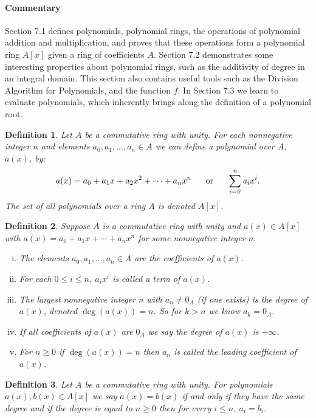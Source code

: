 \documentclass[letterpaper, 12pt]{article}
\newtheorem{defn}{Definition}
\begin{document}
			\paragraph{\color{blue}Commentary}
			\color{blue}
			Section 7.1 defines polynomials, polynomial rings, the operations of polynomial addition and multiplication, and proves that these operations form a polynomial ring $A[x]$ given a ring of coefficients $A$.
			Section 7.2 demonstrates some interesting properties about polynomial rings, such as the additivity of degree in an integral domain.
			This section also contains useful tools such as the Division Algorithm for Polynomials, and the function $\bar{f}$.
			In Section 7.3 we learn to evaluate polynomials, which inherently brings along the definition of a polynomial root.
			\color{black}

			\begin{defn}
			Let $A$ be a commutative ring with unity. 
			For each nonnegative integer $n$ and elements $a_{0}, a_{1}, \dots , a_{n} \in A$ we can define a polynomial over $A$, $a(x)$, by: $$a(x) = a_{0} + a_{1}x + a_{2}x^{2} + \cdots + a_{n}x^{n} \ \ \ \ \ \rm or \it \ \ \ \ \ \sum\limits_{i=0}^{n}a_{i}x^{i}.$$
			The set of all polynomials over a ring $A$ is denoted $A[x]$.
			\end{defn}
			\setcounter{defn}{3}
			\begin{defn}
			Suppose $A$ is a commutative ring with unity and $a(x) \in A[x]$ with $a(x) = a_{0} + a_{1}x + \cdots + a_{n}x^{n}$ for some nonnegative integer $n$.
				\begin{enumerate}[(i)]
				\item The elements $a_{0},a_{1}, \dots , a_{n} \in A$ are the coefficients of $a(x)$.
				\item For each $0 \leq i \leq n$, $a_{i}x^{i}$ is called a term of $a(x)$.
				\item The largest nonnegative integer $n$ with $a_{n} \neq 0_{A}$ (if one exists) is the degree of $a(x)$, denoted $\deg(a(x)) = n$. 
				So for $k > n$ we know $a_{k} = 0_{A}$.
				\item If all coefficients of $a(x)$ are $0_{A}$ we say the degree of $a(x)$ is $-\infty$.
				\item For $n \geq 0$ if $\deg(a(x)) = n$ then $a_{n}$ is called the leading coefficient of $a(x)$.
				\end{enumerate}
			\end{defn}

			\begin{defn}
			Let $A$ be a commutative ring with unity. 
			For polynomials $a(x), b(x) \in A[x]$ we say $a(x) = b(x)$ if and only if they have the same degree and if the degree is equal to $n \geq 0$ then for every $i \leq n$, $a_{i} = b_{i}$.
			\end{defn} 
\end{document}
